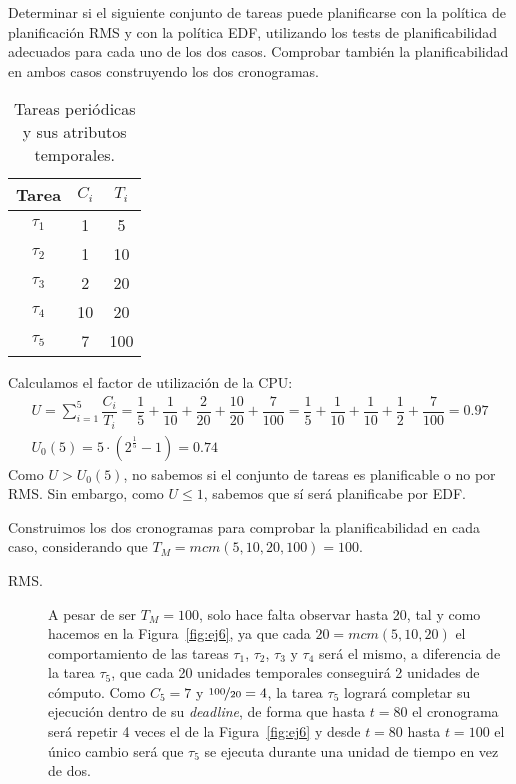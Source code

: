 \begin{ejercicio}\label{ej:rel4_6}
    Determinar si el siguiente conjunto de tareas puede planificarse con la política de planificación RMS y con la política EDF, utilizando los tests de planificabilidad adecuados para cada uno de los dos casos. Comprobar también la planificabilidad en ambos casos construyendo los dos cronogramas.
    \begin{table}[H]
    \centering
    \begin{tabular}{|c|c|c|}
        \hline
        Tarea & $C_i$ & $T_i$ \\
        \hline
        $\tau_1$ & 1 & 5 \\
        \hline
        $\tau_2$ & 1 & 10 \\
        \hline
        $\tau_3$ & 2 & 20 \\
        \hline
        $\tau_4$ & 10 & 20 \\
        \hline
        $\tau_5$ & 7 & 100 \\
        \hline
    \end{tabular}
    \caption{Tareas periódicas y sus atributos temporales.}
    \label{tab:4_6}
    \end{table}

    Calculamos el factor de utilización de la CPU\@:
    \begin{gather*}
        U = \sum_{i=1}^{5}\dfrac{C_i}{T_i} = \dfrac{1}{5} + \dfrac{1}{10} + \dfrac{2}{20} + \dfrac{10}{20} + \dfrac{7}{100} = \dfrac{1}{5} + \dfrac{1}{10} + \dfrac{1}{10} + \dfrac{1}{2} + \dfrac{7}{100} = 0.97\\
        U_0(5) = 5\cdot \left(2^{\frac{1}{5}}-1\right) = 0.74
    \end{gather*}
    Como $U>U_0(5)$, no sabemos si el conjunto de tareas es planificable o no por RMS\@. Sin embargo, como $U\leq 1$, sabemos que sí será planificabe por EDF\@.

    Construimos los dos cronogramas para comprobar la planificabilidad en cada caso, considerando que $T_M=mcm(5,10,20,100)=100$.
    \begin{description}
        \item [RMS.] A pesar de ser $T_M=100$, solo hace falta observar hasta 20, tal y como hacemos en la Figura~\ref{fig:ej6}, ya que cada $20 = mcm(5,10,20)$ el comportamiento de las tareas $\tau_1$, $\tau_2$, $\tau_3$ y $\tau_4$ será el mismo, a diferencia de la tarea $\tau_5$, que cada 20 unidades temporales conseguirá 2 unidades de cómputo. Como $C_5=7$ y $\nicefrac{100}{20} = 4$, la tarea $\tau_5$ logrará completar su ejecución dentro de su \textit{deadline}, de forma que hasta $t=80$ el cronograma será repetir 4 veces el de la Figura~\ref{fig:ej6} y desde $t=80$ hasta $t=100$ el único cambio será que $\tau_5$ se ejecuta durante una unidad de tiempo en vez de dos.


\end{description}
\end{ejercicio}
